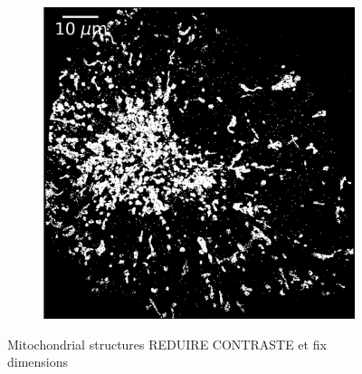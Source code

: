 \begin{figure}
\begin{subfigure}{0.49\textwidth}
        \includegraphics[width=\textwidth]{figures/mitochondria_image12.png}
        \caption{}
    \end{subfigure}
    \caption{Mitochondrial structures REDUIRE CONTRASTE et fix dimensions}
    \label{fig:extra_mitochondria_images}
\end{figure}